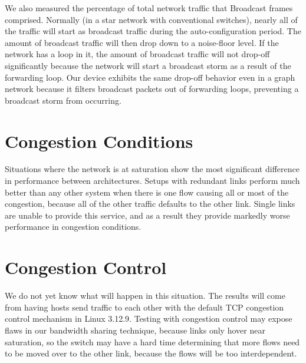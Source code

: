 \documentclass{article}
\begin{document}
We also measured the percentage of total network traffic that Broadcast frames comprised.
Normally (in a star network with conventional switches), nearly all of the traffic will start as broadcast traffic during the auto-configuration period.
The amount of broadcast traffic will then drop down to a noise-floor level.
If the network has a loop in it, the amount of broadcast traffic will not drop-off significantly because the network will start a broadcast storm as a result of the forwarding loop.
Our device exhibits the same drop-off behavior even in a graph network because it filters broadcast packets out of forwarding loops, preventing a broadcast storm from occurring.

\section{Congestion Conditions}
Situations where the network is at saturation show the most significant difference in performance between architectures.
Setups with redundant links perform much better than any other system when there is one flow causing all or most of the congestion, because all of the other traffic defaults to the other link.
Single links are unable to provide this service, and as a result they provide markedly worse performance in congestion conditions.
\section{Congestion Control}
We do not yet know what will happen in this situation.
The results will come from having hosts send traffic to each other with the default TCP congestion control mechanism in Linux 3.12.9.
Testing with congestion control may expose flaws in our bandwidth sharing technique, because links only hover near saturation, so the switch may have a hard time determining that more flows need to be moved over to the other link, because the flows will be too interdependent.
\end{document}
